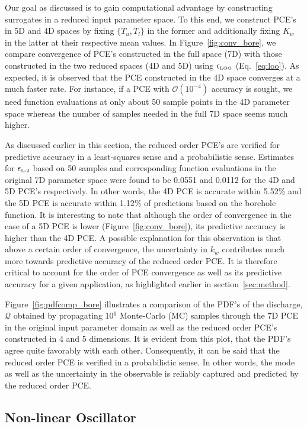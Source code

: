 Our goal as discussed is to gain computational advantage by constructing surrogates in a 
reduced input parameter space. To this end, we construct PCE's in 5D and 4D spaces by
fixing $\{T_u,T_l\}$ in the former and additionally fixing $K_w$ in the latter at their respective
mean values. In Figure~\ref{fig:conv_bore}, we compare convergence of PCE's constructed
in the full space (7D) with those constructed in the two reduced spaces (4D and 5D) using
$\epsilon_{\mbox{\tiny{LOO}}}$ (Eq.~\ref{eq:loo}). As expected, it is observed that the PCE
constructed in the 4D space converges at a much faster rate. For instance, if a PCE with
$\mathcal{O}(10^{-4})$ accuracy is sought, we need function evaluations at only about
50 sample points in the 4D parameter space whereas the number of samples needed in the full 
7D space seems much higher. 

As discussed earlier in this section, the reduced order PCE's are verified for predictive accuracy in 
a least-squares sense and a probabilistic sense. Estimates for $\epsilon_{\mbox{\tiny{L-2}}}$
based on 50 samples and corresponding function evaluations in the original 7D parameter space
were found to be 0.0551 and 0.0112 for the 4D and 5D PCE's respectively. In other words, the 4D
PCE is accurate within 5.52$\%$ and the 5D PCE is accurate within 1.12$\%$ of predictions based on
the borehole function. It is interesting to note that although the order of convergence in the case of a 5D
PCE is lower (Figure~\ref{fig:conv_bore}), its predictive accuracy is higher than the 4D PCE. A possible
explanation for this observation is that above a certain order of convergence, the uncertainty in $k_w$ 
contributes much more towards predictive accuracy of the reduced order PCE. It is therefore critical
to account for the order of PCE convergence as well as its predictive accuracy for a given application,
as highlighted earlier in section~\ref{sec:method}. 

Figure~\ref{fig:pdfcomp_bore} illustrates a comparison of the PDF's of the discharge, $\mathcal{Q}$
obtained by propagating 10$^6$ Monte-Carlo (MC) samples through the 7D PCE in the
original input parameter domain as well as the reduced order PCE's constructed in 4 and 5 dimensions. 
It is evident from this plot, that the PDF's agree quite favorably with each other. Consequently, it can
be said that the reduced order PCE is verified in a probabilistic sense. In other words, the mode as
well as the uncertainty in the observable is reliably captured and predicted by the reduced order PCE. 
 
\subsection{Non-linear Oscillator}

































